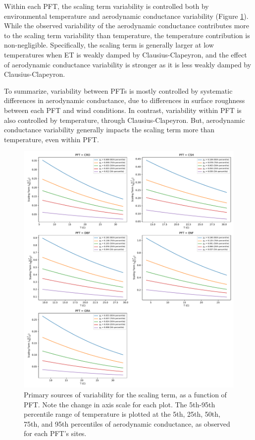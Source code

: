 \documentclass[draft,linenumbers]{agujournal}
\begin{document}
Within each PFT, the scaling term variability is controlled both by environmental temperature and aerodynamic conductance variability (Figure \ref{scale_vary}). While the observed variability of the aerodynamic conductance contributes more to the scaling term variability than temperature, the temperature contribution is non-negligible. Specifically, the scaling term is generally larger at low temperatures when ET is weakly damped by Clausius-Clapeyron, and the effect of aerodynamic conductance variability is stronger as it is less weakly damped by Clausius-Clapeyron.

To summarize, variability between PFTs is mostly controlled by systematic differences in aerodynamic conductance, due to differences in surface roughness between each PFT and wind conditions. In contrast, variability within PFT is also controlled by temperature, through Clausius-Clapeyron. But, aerodynamic conductance variability generally impacts the scaling term more than temperature, even within PFT.

\begin{figure}[h]
\centering
\includegraphics[width=\textwidth]{./fig04b.pdf}
\caption{Primary sources of variability for the scaling term, as a function of PFT. Note the change in axis scale for each plot. The 5th-95th percentile range of temperature is plotted at the 5th, 25th, 50th, 75th, and 95th percentiles of aerodynamic conductance, as observed for each PFT's sites.}
\label{scale_vary}
\end{figure}
\end{document}

